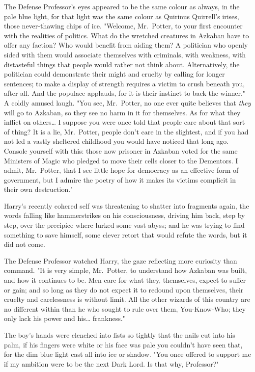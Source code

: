 The Defense Professor's eyes appeared to be the same colour as always, in the
pale blue light, for that light was the same colour as Quirinus Quirrell's
irises, those never-thawing chips of ice. "Welcome, Mr.~Potter, to your first
encounter with the realities of politics. What do the wretched creatures in
Azkaban have to offer any faction? Who would benefit from aiding them? A
politician who openly sided with them would associate themselves with
criminals, with weakness, with distasteful things that people would rather not
think about. Alternatively, the politician could demonstrate their might and
cruelty by calling for longer sentences; to make a display of strength requires
a victim to crush beneath you, after all. And the populace applauds, for it is
their instinct to back the winner." A coldly amused laugh. "You see,
Mr.~Potter, no one ever quite believes that \emph{they} will go to Azkaban, so
they see no harm in it for themselves. As for what they inflict on
others{\ldots} I suppose you were once told that people care about that sort of
thing? It is a lie, Mr.~Potter, people don't care in the slightest, and if you
had not led a vastly sheltered childhood you would have noticed that long ago.
Console yourself with this: those now prisoner in Azkaban voted for the same
Ministers of Magic who pledged to move their cells closer to the Dementors. I
admit, Mr.~Potter, that I see little hope for democracy as an effective form of
government, but I admire the poetry of how it makes its victims complicit in
their own destruction."

Harry's recently cohered self was threatening to shatter into fragments again,
the words falling like hammerstrikes on his consciousness, driving him back,
step by step, over the precipice where lurked some vast abyss; and he was
trying to find something to save himself, some clever retort that would refute
the words, but it did not come.

The Defense Professor watched Harry, the gaze reflecting more curiosity than
command. "It is very simple, Mr.~Potter, to understand how Azkaban was built,
and how it continues to be. Men care for what they, themselves, expect to
suffer or gain; and so long as they do not expect it to redound upon
themselves, their cruelty and carelessness is without limit. All the other
wizards of this country are no different within than he who sought to rule over
them, You-Know-Who; they only lack his power and his{\ldots} frankness."

The boy's hands were clenched into fists so tightly that the nails cut into his
palm, if his fingers were white or his face was pale you couldn't have seen
that, for the dim blue light cast all into ice or shadow. "You once offered to
support me if my ambition were to be the next Dark Lord. Is that why,
Professor?"

